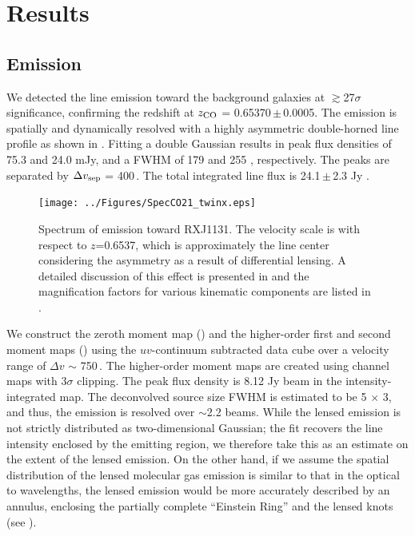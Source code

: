 \documentclass[]{emulateapj}
\begin{document}
\section{Results} \label{sec:results}
\subsection{\bco Emission} \label{sec:CO21} %
We detected the \bco line emission toward the background galaxies
at $\gtrsim$27$\sigma$ significance, confirming the redshift at $z_{\rm CO}$ =
0.65370\,$\pm$\,0.0005. The emission is spatially and dynamically resolved
with a highly asymmetric double-horned line profile
as shown in . Fitting a double Gaussian results in peak
flux densities of 75.3 and 24.0 mJy, and a FWHM of
179 \kms and 255 \kms, respectively. The peaks are separated by
$\Delta v_{\rm sep}$ = 400\,\kms. The total integrated line flux is 24.1\,$\pm$\,2.3 Jy \kms. %

\begin{figure}[!htbp]
\centering
\texttt{[image: ../Figures/SpecCO21\_twinx.eps]}
\caption{ Spectrum of \bco emission toward RXJ1131. The velocity scale
is with respect to $z$=0.6537, which is approximately the line center
considering the asymmetry as a result of differential lensing.
A detailed discussion of this effect is presented in
 and the magnification factors for various kinematic
components are listed in .
 \label{fig:CO21spec}}
\end{figure}

We construct the zeroth moment map () and
the higher-order first and second moment maps ()
using the $uv$-continuum subtracted data cube over a velocity range of
$\Delta v$ $\sim$ 750\,\kms. The higher-order moment maps are created using
channel maps with 3$\sigma$ clipping.
The peak flux density is 8.12 Jy\,\kms\,beam\pmOne
in the intensity-integrated map. The deconvolved source size FWHM
is estimated to be 5 $\times$ 3,
and thus, the emission is resolved over $\sim$2.2 beams.
While the lensed emission is not strictly distributed as two-dimensional
Gaussian;
the fit recovers the line intensity enclosed by the emitting
region, we therefore take this as an estimate on the extent of the lensed
emission. On the other hand, if we assume the spatial distribution of
the lensed molecular gas emission is similar to that in the optical to \nir
wavelengths, the lensed emission would be more accurately described by an
annulus, enclosing the partially complete ``Einstein Ring'' and
the lensed knots (see ).
\end{document}
